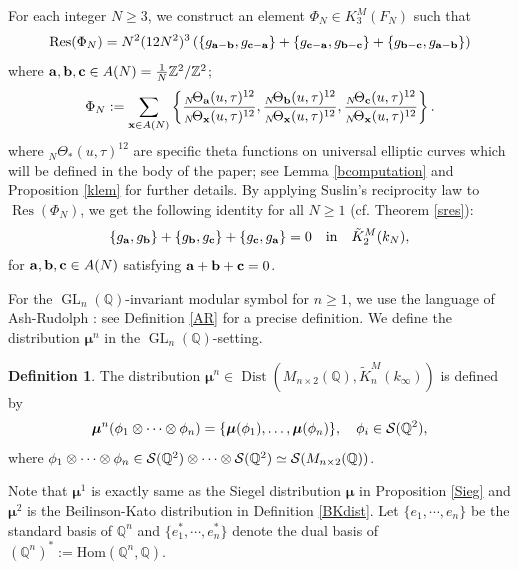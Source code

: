 \documentclass[12pt,amstex,amssymb]{article}
\theoremstyle{plain}
\theoremstyle{definition}
\newtheorem{definition}[theorem]{Definition}
\def\cF{{\cal F}}
\def\cS{{\cal S}}
\def\fH{{\frak H}}
\def\cO{\mathcal {O}}
\def\Z{{\mathbb Z}}
\def\Q{{\mathbb Q}}
\def\Hom{\text{Hom}}
\def\Aut{\text{Aut}}
\def\bx {{\bf x}}
\def\ulambda {{\underline{\lambda}}}
\newcommand{\be}{\begin{eqnarray*}}
\newcommand{\ee}{\end{eqnarray*}}
\newcommand{\bea}{\begin{eqnarray}}
\newcommand{\eea}{\end{eqnarray}}
\newcommand{\Res}{\operatorname{Res}}
\newcommand{\GL}{\operatorname{GL}}
\newcommand{\ba}{\mathbf{a}}
\newcommand{\bb}{\mathbf{b}}
\newcommand{\bc}{{\bf c}}
\newcommand{\Dist}{\operatorname{Dist}}
\begin{document}
%
For each integer $N \geq 3$, we construct an element $\Phi_N \in K^M_3(F_N)$ such that
\bea
\Res(\Phi_N)=N^2(12N^2)^3\left( \{g_{\ba-\bb},g_{\bc-\ba}\} +  \{g_{\bc-\ba},g_{\bb-\bc}\} +  \{g_{\bb-\bc},g_{\ba-\bb}\} \right)
\eea
where $\ba,\bb,\bc \in A(N)=\frac{1}{N}\Z^2/\Z^2$;  
$$
\Phi_N:=\sum_{\bx \in A(N)} \left\{\frac{_{N}\!\Theta_{\ba}(u,\tau)^{12}}{_{N}\!\Theta_{\bx}(u,\tau)^{12}},\frac{_{N}\!\Theta_{\bb}(u,\tau)^{12}}{_{N}\!\Theta_{\bx}(u,\tau)^{12}},\frac{_{N}\!\Theta_{\bc}(u,\tau)^{12}}{_{N}\!\Theta_{\bx}(u,\tau)^{12}}\right\}.
$$
where $_{N}\!\Theta_{*}(u,\tau)^{12}$ are specific theta functions on universal elliptic curves which will be defined in the body of the paper;
see Lemma \ref{bcomputation} and Proposition \ref{klem} for further details.
By applying Suslin's reciprocity law to $\Res(\Phi_N)$, we get the following identity for all $N\geq 1$ (cf. Theorem \ref{sres}):
\bea\label{Maninrelation}
\{g_\ba, g_\bb \}+\{g_\bb, g_\bc\}+\{g_\bc, g_\ba\}=0\quad\text{in}\quad  \tilde K^M_2(k_N),
\eea
for $\ba,\bb,\bc \in A(N)$ satisfying $ \ba+\bb+\bc=0$.

For the $\GL_n(\Q)$-invariant modular symbol for $n\geq 1$, we use the language of Ash-Rudolph \cite{AS}: see Definition \ref{AR} for a precise definition.
We define the distribution ${\bm\mu}^n$ in the $\GL_n(\Q)$-setting.
\begin{definition}\label{glnSD}
The distribution ${\bm\mu}^n \in \Dist(M_{n\times2}(\Q),\tilde K^M_n(k_\infty))$ is defined by
\be
{\bm\mu}^n(\phi_1 \otimes \cdots \otimes \phi_n) = \{{\bm\mu}(\phi_1), \ldots, {\bm\mu}(\phi_n) \},
\quad \phi_i \in \cS(\Q^2),
\ee
where $\phi_1 \otimes \cdots \otimes \phi_n \in \cS(\Q^2) \otimes \cdots \otimes \cS(\Q^2) \simeq \cS(M_{n\times 2}(\Q))$.
\end{definition}
Note that ${\bm\mu}^1$ is exactly same as the Siegel distribution ${\bm\mu}$ in Proposition \ref{Sieg} and ${\bm\mu}^2$ is the Beilinson-Kato distribution in Definition \ref{BKdist}.
Let $\{e_1, \cdots, e_n\}$ be the standard basis of $\Q^n$ and $\{e_1^*, \cdots, e_n^*\}$ denote the dual basis of $(\Q^n)^*:=\Hom(\Q^n,\Q)$.
\end{document}
